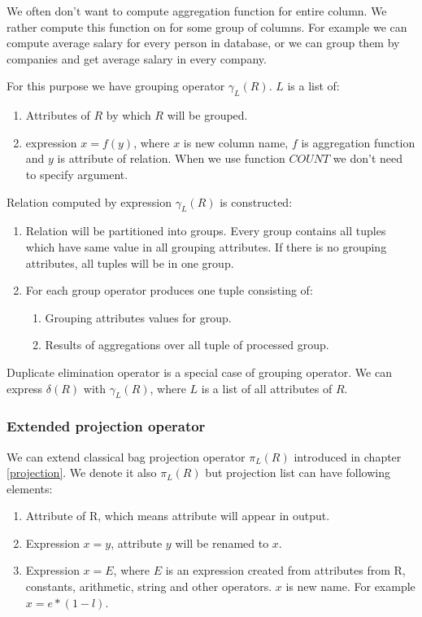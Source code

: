 We often don't want to compute aggregation function for entire column. We rather compute this function on for some group of columns. For example we can compute average salary for every person in database, or we can group them by companies and get average salary in every company. 

For this purpose we have grouping operator $\gamma_L(R)$. $L$ is a list of:

\begin{enumerate}
\item Attributes of $R$ by which $R$ will be grouped.
\item expression $x=f(y)$, where $x$ is new column name, $f$ is aggregation function and $y$ is attribute of relation. When we use function $COUNT$ we don't need to specify argument.
\end{enumerate}

Relation computed by expression $\gamma_L(R)$ is constructed:

\begin{enumerate}
\item Relation will be partitioned into groups. Every group contains all tuples which have same value in all grouping attributes. If there is no grouping attributes, all tuples will be in one group.
\item For each group operator produces one tuple consisting of:
 \begin{enumerate}
 	\item Grouping attributes values for group.
 	\item Results of aggregations over all tuple of processed group.
 \end{enumerate}
\end{enumerate}

Duplicate elimination operator is a special case of grouping operator. We can express $\delta(R)$ with $\gamma_{L}(R)$, where $L$ is a list of all attributes of $R$.

\subsubsection{Extended projection operator}

We can extend classical bag projection operator $\pi_L(R)$ introduced in chapter \ref{projection}. We denote it also $\pi_L(R)$ but projection list can have following elements:

\begin{enumerate}
\item Attribute of R, which means attribute will appear in output.
\item Expression $x = y$, attribute $y$ will be renamed to $x$.
\item Expression $x = E$, where $E$ is an expression created from attributes from R, constants, arithmetic, string  and other operators. $x$ is new name. For example $x=e*(1-l)$.
\end{enumerate}



